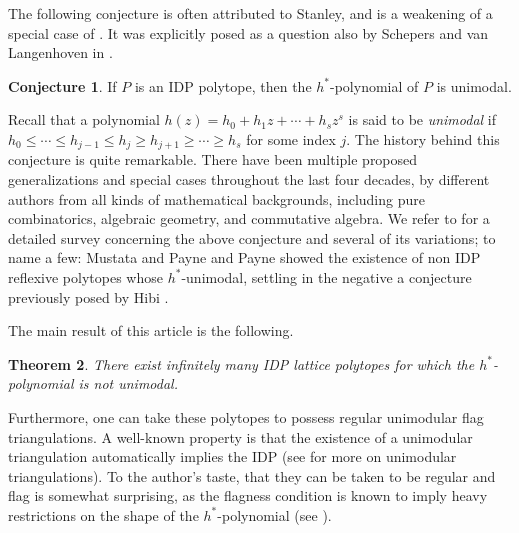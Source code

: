 \documentclass[11pt, letterpaper, english]{amsart}
\theoremstyle{teoremas}
\newtheorem{theorem}{Theorem}[section]
\theoremstyle{definition}
\newtheorem{conjecture}[theorem]{Conjecture}
\begin{document}
The following conjecture is often attributed to Stanley, and is a weakening of a special case of \cite[Conjecture~4]{stanley-conj}. It was explicitly posed as a question also by Schepers and van Langenhoven in \cite[Question~1.1]{schepers-vanlangenhoven}.

\begin{conjecture}\label{conj:stanley}
    If $P$ is an IDP polytope, then the $h^*$-polynomial of $P$ is unimodal.
\end{conjecture}

Recall that a polynomial $h(z) = h_0 + h_1z + \cdots + h_sz^s$ is said to be \emph{unimodal} if $h_0 \leq \cdots \leq h_{j-1}\leq h_j \geq h_{j+1} \geq \cdots \geq h_s$ for some index $j$.
The history behind this conjecture is quite remarkable. There have been multiple proposed generalizations and special cases throughout the last four decades, by different authors from all kinds of mathematical backgrounds, including pure combinatorics, algebraic geometry, and commutative algebra. We refer to \cite{braun,ferroni-higashitani} for a detailed survey concerning the above conjecture and several of its variations; to name a few: Mustata and Payne \cite{mustata-payne} and Payne \cite{payne} showed the existence of non IDP reflexive polytopes whose $h^*$-unimodal, settling in the negative a conjecture previously posed by Hibi \cite{hibi}.

The main result of this article is the following.

\begin{theorem}\label{thm:main-unimodality}
    There exist infinitely many IDP lattice polytopes for which the $h^*$-polynomial is not unimodal. 
\end{theorem}

Furthermore, one can take these polytopes to possess regular unimodular flag triangulations. A well-known property is that the existence of a unimodular triangulation automatically implies the IDP (see \cite{deloera-rambau-santos,haase-paffenholz-piechnik-santos} for more on unimodular triangulations). To the author's taste, that they can be taken to be regular and flag is somewhat surprising, as the flagness condition is known to imply heavy restrictions on the shape of the $h^*$-polynomial (see \cite[Theorem~3.14]{ferroni-higashitani}).
\end{document}
